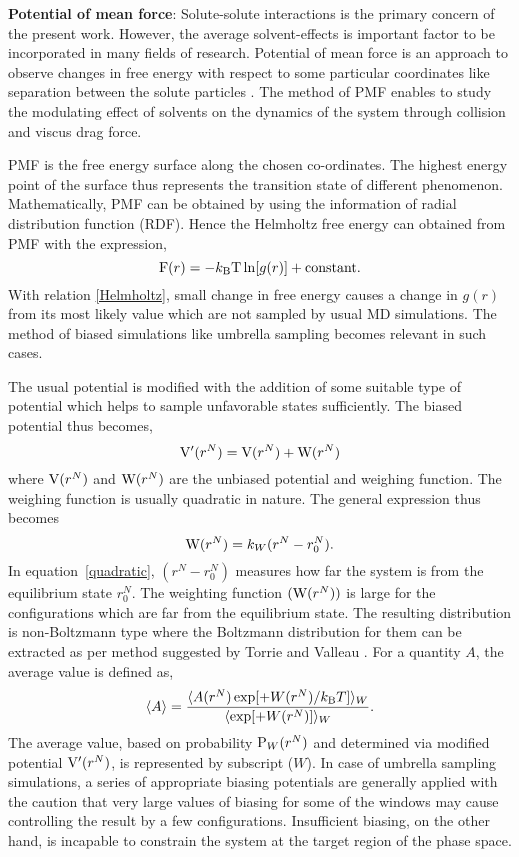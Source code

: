{\bf Potential of mean force}: Solute-solute interactions is the primary concern of the present work. However, the average solvent-effects is important factor to be incorporated in many fields of research. Potential of mean force is an approach to observe changes in free energy with respect to some particular coordinates like separation between the solute particles \citep{Leach2001}. The method of PMF enables to study the modulating effect of solvents on the dynamics of the system through collision and viscus drag force. 
 
PMF is the free energy surface along the chosen co-ordinates. The highest energy point of the surface thus represents the transition state of different phenomenon. Mathematically, PMF can be obtained by using the information of radial distribution function (RDF). Hence the Helmholtz free energy can obtained from PMF with the expression,  
\begin{equation}\label{Helmholtz}
{\rm F}(r) = - k_{\rm B}{\rm T} \ln[g(r)] + {\rm constant}.
\end{equation}
With relation \ref{Helmholtz}, small change in free energy causes a change in $g(r)$ from its most likely value which are not sampled by usual MD simulations. The method of biased simulations like umbrella sampling becomes relevant in such cases. 
 
The usual potential is modified with the addition of some suitable type of potential which helps to sample unfavorable states sufficiently. The biased potential thus becomes, 
\begin{equation}\label{biased}
{\rm V'}(r^N) =   {\rm V}(r^N) + {\rm W}(r^N)
\end{equation}
where ${\rm V}(r^N)$ and ${\rm W}(r^N)$ are the unbiased potential and weighing function. The weighing function is usually quadratic in nature. The 
general expression thus becomes
\begin{equation}\label{quadratic}
{\rm W}(r^N) = k_W (r^N-r_0^N).
\end{equation}
In equation~\ref{quadratic}, $(r^N-r_0^N)$ measures how far the system is from the equilibrium state $r_0^N$. The weighting function $({\rm W}(r^N))$ is large for the configurations which are far from the equilibrium state. The 
resulting distribution is non-Boltzmann type where the Boltzmann distribution for them can be extracted as per method suggested by Torrie and Valleau \citep{Torrie1977a}. For a quantity $A$, the average value is defined as, 
\begin{equation}\label{non-boltzmann}
\langle A \rangle = \frac{ \langle A(r^N) \exp[+W(r^N)/k_{\rm B}T]\rangle _W}{\langle \exp[+W(r^N)]\rangle_W}.
\end{equation}
The average value, based on probability ${\rm P}_W(r^N)$ and determined via modified potential ${\rm V'}(r^N)$, is represented by subscript ($W$). In case of umbrella sampling simulations, a series of appropriate biasing potentials are generally applied with the caution that very large values of biasing for some of the windows may cause controlling the result by a few configurations. Insufficient biasing, on the other hand, is incapable to constrain the system at the target region of the phase space.

